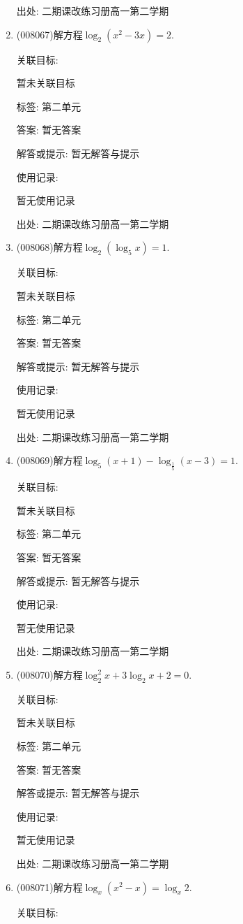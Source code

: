 \documentclass[10pt,a4paper]{article}
\begin{document}
\begin{enumerate}[1.]
出处: 二期课改练习册高一第二学期
\item { (008067)}解方程$\log _2(x^2-3x)=2$.


关联目标:

暂未关联目标



标签: 第二单元

答案: 暂无答案

解答或提示: 暂无解答与提示

使用记录:

暂无使用记录


出处: 二期课改练习册高一第二学期
\item { (008068)}解方程$\log _2(\log _5x)=1$.


关联目标:

暂未关联目标



标签: 第二单元

答案: 暂无答案

解答或提示: 暂无解答与提示

使用记录:

暂无使用记录


出处: 二期课改练习册高一第二学期
\item { (008069)}解方程$\log _5(x+1)-\log _{\frac 15}(x-3)=1$.


关联目标:

暂未关联目标



标签: 第二单元

答案: 暂无答案

解答或提示: 暂无解答与提示

使用记录:

暂无使用记录


出处: 二期课改练习册高一第二学期
\item { (008070)}解方程$\log _2^2x+3\log _2x+2=0$.


关联目标:

暂未关联目标



标签: 第二单元

答案: 暂无答案

解答或提示: 暂无解答与提示

使用记录:

暂无使用记录


出处: 二期课改练习册高一第二学期
\item { (008071)}解方程$\log _x(x^2-x)=\log _x2$.


关联目标:


\end{enumerate}
\end{document}
